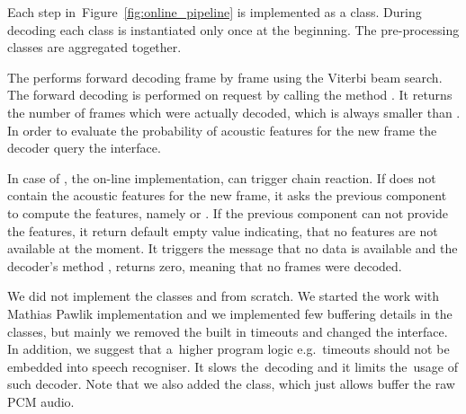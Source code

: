 Each step in~Figure~\ref{fig:online_pipeline} is implemented as a class.
During decoding each class is instantiated only once at the beginning.
The pre-processing classes are aggregated together. 

The  performs forward decoding frame by frame using the Viterbi beam search.
The forward decoding is performed on request by calling the method .
It returns the number of frames which were actually decoded, which is always smaller than .
In order to evaluate the probability of acoustic features for the new frame
the decoder query the  interface.

In case of , the on-line implementation, can trigger chain reaction.
If  does not contain the acoustic features for the new frame, it asks
the previous component to compute the features, namely  or .
If the previous component can not provide the features, it return default empty value indicating,
that no features are not available at the moment. It triggers the message that no data is available
and the decoder's method , returns zero, meaning that no frames were decoded.


We did not implement the classes  and 
from scratch. We started the work with Mathias Pawlik implementation and we implemented few buffering details
in the classes, but mainly we removed the built in timeouts and changed the interface.
In addition, we suggest that a~higher program logic e.g.\ timeouts should not be embedded into speech recogniser.
It slows the~decoding and it limits the~usage of such decoder.
Note that we also added the  class, which just allows buffer the raw \ac{PCM} audio.



